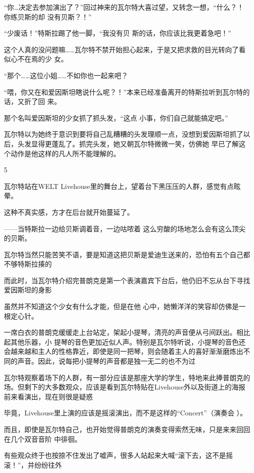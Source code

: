 \documentclass{article}
\begin{document}
“你…决定去参加演出了？”回过神来的瓦尔特大喜过望，又转念一想，“什么？！你练贝斯的却
没有贝斯？！” 

\newpage

“少废话！”特斯拉踢了他一脚，“我没有贝
斯的话，你应该比我更着急吧！” 

这个人真的没问题嘛……瓦尔特不禁开始担心起来，于是又把求救的目光转向了看似心不在焉的少
女。 

“那个……这位小姐……不如你也一起来吧？

“喂，你又在和爱因斯坦瞎说什么呢？！”本来已经准备离开的特斯拉听到瓦尔特的话，又折了回
来。 

那个名叫爱因斯坦的少女抓了抓头发，“这点
小事，你们自己就能搞定吧。” 

瓦尔特以为她终于意识到要将自己乱糟糟的头发理顺一点，没想到爱因斯坦抓了以后，头发显得更蓬乱了。抓完头发，她又朝瓦尔特微微一笑，仿佛她
早已了解这个动作是他这样的凡人所不能理解的。 

\newpage


5 

瓦尔特站在WELT Livehouse里的舞台上，望着台下黑压压的人群，感觉有点眩晕。


这种不真实感，方才在后台就开始蔓延了。 

——当特斯拉一边给贝斯调着音，一边咕哝着
这么穷酸的场地怎么会有这么顶尖的贝斯。 

瓦尔特当然只能苦笑不语，要是知道这把贝斯是爱迪生送来的，恐怕有五个自己都不够特斯拉揍的

而此时，当瓦尔特介绍完普朗克是第一个表演嘉宾下台后，他仍旧不忘从台下寻找爱因斯坦的身影

虽然并不知道这个少女有什么才能，但是在他
心中，她懒洋洋的笑容却仿佛是一根定心针。 

一席白衣的普朗克缓缓走上台站定，架起小提琴，清亮的声音便从弓间跃出。相比起其他乐器，小
\newpage
提琴的音色更加近似人声。特别是瓦尔特听说，小提琴的音色还会越来越和主人的性格靠近，即使是同一把琴，则会随着主人的喜好渐渐磨炼出不同的声音。因此，说每把小提琴的声音都是独一无二的也不为过

瓦尔特观察着场下的人群，有一部分应该是那座大学的学生，特地来此捧普朗克的场。但剩下的大多数观众，应该是看到瓦尔特贴在Livehouse外以及街道上的海报前来看演出，现在则很是疑惑

毕竟，Livehouse里上演的应该是摇滚演出，而不是这样的“Concert”（演奏会
）。 

而且，即使是瓦尔特自己，也开始觉得普朗克的演奏变得索然无味，只是来来回回在几个双音音阶
中徘徊。 

有些观众终于也按捺不住发出了嘘声，很多人站起来大喊“滚下去，这不是摇滚！”，并纷纷往外
\end{document}
